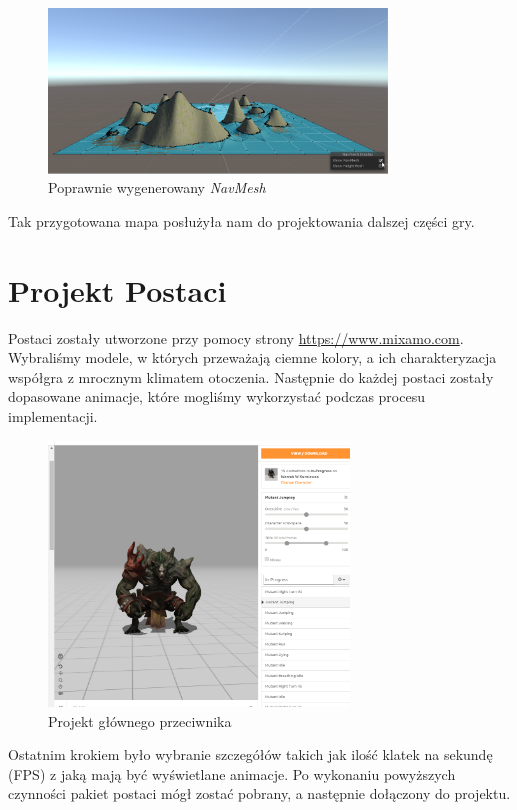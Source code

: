 \documentclass[openright]{xmgr}
\begin{document}
        \begin{figure}[H]
        \center
        \includegraphics[width=9cm]{teren_obiekty3.png}
        \caption{Poprawnie wygenerowany \textit{NavMesh}}
        \end{figure}

        Tak przygotowana mapa posłużyła nam do projektowania dalszej części gry.

  
  \section{Projekt Postaci}

    Postaci zostały utworzone przy pomocy strony \url{https://www.mixamo.com}. Wybraliśmy modele, w których przeważają ciemne kolory, a ich charakteryzacja współgra z mrocznym klimatem otoczenia. 
    Następnie do każdej postaci zostały dopasowane animacje, które mogliśmy wykorzystać podczas procesu implementacji.
    \begin{figure}[H]
      \center
      \includegraphics[width=8cm]{mixamo.png}
      \caption{Projekt głównego przeciwnika}
    \end{figure}
    Ostatnim krokiem było wybranie szczegółów takich jak ilość klatek na sekundę (FPS) z jaką mają być wyświetlane animacje. 
    Po wykonaniu powyższych czynności pakiet postaci mógł zostać pobrany, a następnie dołączony do projektu.
\end{document}
